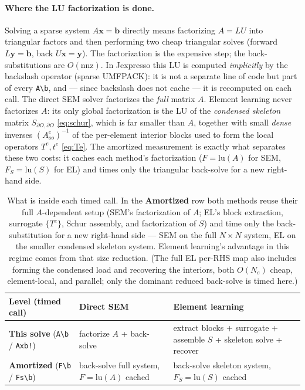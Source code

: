 \documentclass[11pt]{article}
\newcommand{\Aoo}{A_{oo}}
\begin{document}
\paragraph{Where the LU factorization is done.} Solving a sparse system
$A\mathbf{x}=\mathbf{b}$ directly means factorizing $A=LU$ into triangular factors
and then performing two cheap triangular solves (forward $L\mathbf{y}=\mathbf{b}$,
back $U\mathbf{x}=\mathbf{y}$). The factorization is the expensive step; the
back-substitutions are $O(\mathrm{nnz})$. In Jexpresso this LU is computed
\emph{implicitly} by the backslash operator (sparse UMFPACK): it is not a separate
line of code but part of every \verb|A\b|, and --- since backslash does not cache
--- it is recomputed on each call. The direct SEM solver factorizes the
\emph{full} matrix $A$. Element learning never factorizes $A$: its only global
factorization is the LU of the \emph{condensed skeleton} matrix
$S_{\partial O,\partial O}$ \eqref{eq:schur}, which is far smaller than $A$,
together with small \emph{dense} inverses $(\Aoo^e)^{-1}$ of the per-element
interior blocks used to form the local operators $T^e,t^e$ \eqref{eq:Te}. The
amortized measurement is exactly what separates these two costs: it caches each
method's factorization ($F=\mathrm{lu}(A)$ for SEM, $F_S=\mathrm{lu}(S)$ for EL)
and times only the triangular back-solve for a new right-hand side.

\begin{table}[h]
\centering
\small
\setlength{\tabcolsep}{4pt}
\begin{tabularx}{\textwidth}{@{}>{\hsize}Y >{\hsize}Y >{\hsize}Y@{}}
\toprule
Level (timed call) & Direct SEM & Element learning \\
\midrule
\textbf{This solve} (\verb|A\b| / \verb|Axb!|) & factorize $A$ + back-solve & extract blocks + surrogate + assemble $S$ + skeleton solve + recover \\[2pt]
\textbf{Amortized} (\verb|F\b| / \verb|Fs\b|) & back-solve full system, $F=\mathrm{lu}(A)$ cached & back-solve skeleton system, $F_S=\mathrm{lu}(S)$ cached \\
\bottomrule
\end{tabularx}
\caption{What is inside each timed call. In the \textbf{Amortized} row both methods
reuse their full $A$-dependent setup (SEM's factorization of $A$; EL's block
extraction, surrogate $\{T^e\}$, Schur assembly, and factorization of $S$) and time
only the back-substitution for a new right-hand side --- SEM on the full $N\times N$
system, EL on the smaller condensed skeleton system. Element learning's advantage in
this regime comes from that size reduction. (The full EL per-RHS map also includes
forming the condensed load and recovering the interiors, both $O(N_e)$ cheap,
element-local, and parallel; only the dominant reduced back-solve is timed here.)}
\label{tab:cost}
\end{table}
\end{document}
